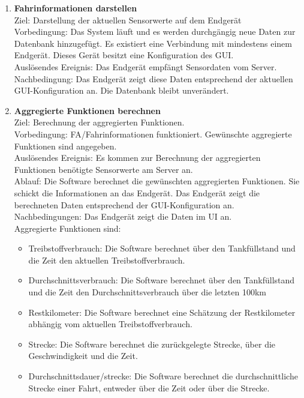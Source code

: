 \documentclass[pflichtenheft.tex]{subfiles}
\begin{document}
	\begin{enumerate}

	\setcounter{enumi}{\value{enumTemp}}


		\item{\textbf{Fahrinformationen darstellen}} \label{liveData} \\ Ziel: Darstellung der aktuellen Sensorwerte auf dem Endgerät \\ Vorbedingung: Das System läuft und es werden durchgängig neue Daten zur Datenbank hinzugefügt. Es existiert eine Verbindung mit mindestens einem Endgerät. Dieses Gerät besitzt eine Konfiguration des GUI. \\ Auslösendes Ereignis: Das Endgerät empfängt Sensordaten vom Server.\\ Nachbedingung: Das Endgerät zeigt diese Daten entsprechend der aktuellen GUI-Konfiguration an. Die Datenbank bleibt unverändert.

		\item{\textbf{Aggregierte Funktionen berechnen}} \\ Ziel: Berechnung der aggregierten Funktionen. \\ Vorbedingung: FA/Fahrinformationen funktioniert. Gewünschte aggregierte Funktionen sind angegeben. \\ Auslösendes Ereignis: Es kommen zur Berechnung der aggregierten Funktionen benötigte Sensorwerte am Server an. \\ Ablauf: Die Software berechnet die gewünschten aggregierten Funktionen. Sie schickt die Informationen an das Endgerät. Das Endgerät zeigt die berechneten Daten entsprechend der GUI-Konfiguration an. \\ Nachbedingungen: Das Endgerät zeigt die Daten im UI an.  \\ Aggregierte Funktionen sind:
		\begin{itemize}
			\item Treibstoffverbrauch: Die Software berechnet über den Tankfüllstand und die Zeit den aktuellen Treibstoffverbrauch.
			\item Durchschnittsverbrauch: Die Software berechnet über den Tankfüllstand und die Zeit den Durchschnittsverbrauch über die letzten 100km
			\item Restkilometer: Die Software berechnet eine Schätzung der Restkilometer abhängig vom aktuellen Treibstoffverbrauch.
			\item Strecke: Die Software berechnet die zurückgelegte Strecke, über die Geschwindigkeit und die Zeit.
			\item Durchschnittsdauer/strecke: Die Software berechnet die durchschnittliche Strecke einer Fahrt, entweder über die Zeit oder über die Strecke.
		\end{itemize}


	\setcounter{enumTemp}{\value{enumi}}
	\end{enumerate}
\end{document}
